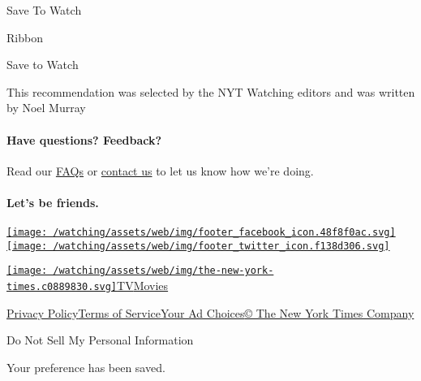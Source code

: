 Save To Watch

Ribbon

Save to Watch

This recommendation was selected by the NYT Watching editors and was
written by Noel Murray

\hypertarget{have-questions-feedback}{%
\paragraph{Have questions? Feedback?}\label{have-questions-feedback}}

Read our \href{//www.nytimes.com/2017/01/10/watching/faq.html}{FAQs} or
\href{mailto:watchingcare@nytimes.com}{contact us} to let us know how
we're doing.

\hypertarget{lets-be-friends}{%
\paragraph{Let's be friends.}\label{lets-be-friends}}

\href{https://www.facebook.com/nytwatching/}{\texttt{[image: /watching/assets/web/img/footer\_facebook\_icon.48f8f0ac.svg]}}\href{https://twitter.com/watching}{\texttt{[image: /watching/assets/web/img/footer\_twitter\_icon.f138d306.svg]}}

\href{//www.nytimes.com}{\texttt{[image: /watching/assets/web/img/the-new-york-times.c0889830.svg]}}\href{//www.nytimes.com/section/arts/television}{TV}\href{//www.nytimes.com/section/movies}{Movies}

\href{//www.nytimes.com/content/help/rights/privacy/policy/privacy-policy.html}{Privacy
Policy}\href{//www.nytimes.com/content/help/rights/terms/terms-of-service.html}{Terms
of
Service}\href{//www.nytimes.com/content/help/rights/privacy/policy/privacy-policy.html\#pp}{Your
Ad Choices}\href{http://www.nytco.com/}{© The New York Times Company}

Do Not Sell My Personal Information

Your preference has been saved.
